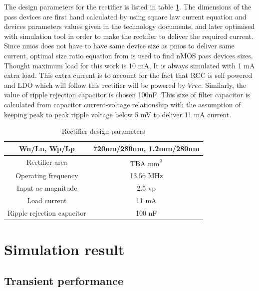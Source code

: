 \documentclass[UKenglish]{ifimaster}  %
\begin{document}
The design parameters for the rectifier is listed in table  \ref{tab:rect_parameter}. The dimensions of the pass devices are first hand calculated by using square law current equation and devices parameters values given in the technology documents, and later optimised with simulation tool in order to make the rectifier to deliver the required current. Since \acrshort{nmos} does not have to have same device size as \acrshort{pmos} to deliver same current, optimal size ratio equation from \cite{rectsize} is used to find nMOS pass devices sizes. Thought maximum load for this work is 10 mA, It is always simulated with 1 mA extra load. This extra current is to account for the fact that RCC is self powered and LDO which will follow this rectifier will be powered by $Vrec$. Similarly, the value of ripple rejection capacitor is chosen 100nF. This size of 
filter capacitor is calculated from capacitor current-voltage relationship with the assumption of keeping peak to peak ripple voltage below 5 mV to deliver 11 mA current.  \\

\begin{table}[H]
\caption{Rectifier design parameters}
\begin{center}
\begin{tabular}{c|c}
\hline \hline
Wn/Ln, Wp/Lp 		& 720um/280nm, 1.2mm/280nm \\ \hline
Rectifier area 		& TBA mm\textsuperscript{2} \\ \hline
Operating frequency 	& 13.56 MHz \\ \hline
Input ac magnitude	& 2.5  \acrshort{vp}\\ \hline
Load current 		& 11 mA \\ \hline
Ripple rejection capacitor	& 100 nF \\ 
\hline \hline
\end{tabular}
\end{center}
\label{tab:rect_parameter}
\end{table}

\section{Simulation result}		%

\subsection{Transient performance}	%
\end{document}
